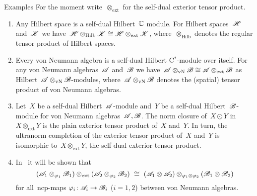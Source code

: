 \documentclass[b]{subfiles}
\begin{document}
\begin{parsec}
\begin{point}{Examples}%
For the moment write~$\otimes_{\text{ext}}$ for the self-dual exterior
    tensor product.
\begin{enumerate}
\item
Any Hilbert space is a self-dual Hilbert~$\mathbb{C}$ module.
For Hilbert spaces~$\mathscr{H}$ and~$\mathscr{K}$
    we have~$\mathscr{H} \otimes_{\text{Hilb}} \mathscr{K}
        \cong \mathscr{H} \otimes_{\text{ext}} \mathscr{K}$,
    where~$\otimes_{\text{Hilb}}$ denotes the regular tensor product of
    Hilbert spaces.
\item
Every von Neumann algebra is a self-dual Hilbert C$^*$-module
    over itself.
For any von Neumann algebras~$\mathscr{A}$ and~$\mathscr{B}$
    we have~$\mathscr{A}\otimes_{\text{vN}} \mathscr{B}
        \cong \mathscr{A} \otimes_{\text{ext}} \mathscr{B}$
        as Hilbert~$\mathscr{A}\otimes_{\text{vN}} \mathscr{B}$-modules,
        where~$\mathscr{A}\otimes_{\text{vN}}\mathscr{B}$ denotes the (spatial)
        tensor product of von Neumann algebras.
\item
Let~$X$ be a self-dual Hilbert~$\mathscr{A}$-module
    and~$Y$ be a self-dual Hilbert~$\mathscr{B}$-module
        for von Neumann algebras~$\mathscr{A},\mathscr{B}$.
The norm closure of~$X\odot Y$
    in~$X \otimes_{\text{ext}} Y$
        is the plain exterior tensor product of~$X$ and~$Y$.
In turn, the ultranorm completion of the exterior tensor product
    of~$X$ and~$Y$ is isomorphic to~$X \otimes_{\text{ext}} Y$,
        the self-dual exterior tensor product.
\item
In~ it will be shown that
\begin{equation*}
(\scrA_1 \otimes_{\varphi_1} \scrB_1)
    \otimes_{\text{ext}} (\scrA_2 \otimes_{\varphi_2} \scrB_2)
\ \cong \ 
(\scrA_1 \otimes \scrA_2) \otimes_{\varphi_1\otimes \varphi_2} (\scrB_1 \otimes \scrB_2)
\end{equation*}
        for all~ncp-maps $\varphi_i\colon \mathscr{A}_i \to \mathscr{B}_i$ ($i=1,2$)
    between von Neumann algebras.
\end{enumerate}
\end{point}
\end{parsec}
\end{document}
